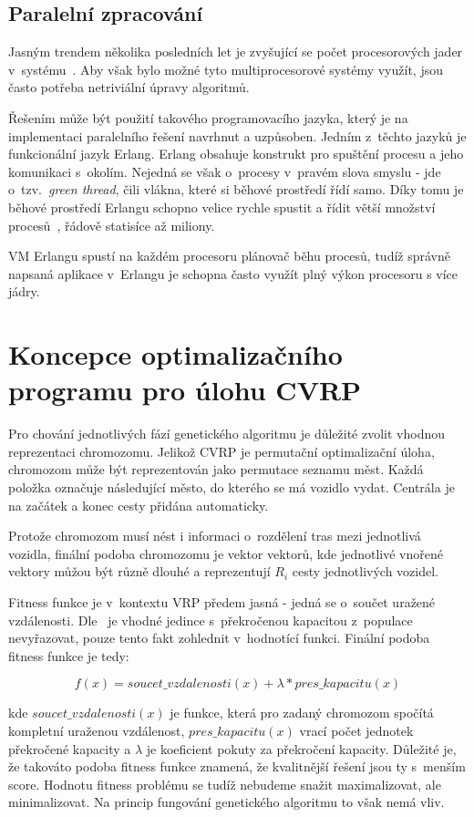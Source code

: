 \documentclass[a4paper]{article}
\begin{document}
\subsection{Paralelní zpracování}
Jasným trendem několika posledních let je zvyšující se počet procesorových jader v~systému~\cite{sekanina}. Aby však bylo možné tyto multiprocesorové systémy využít, jsou často potřeba netriviální úpravy algoritmů.

Řešením může být použití takového programovacího jazyka, který je na implementaci paralelního řešení navrhnut a uzpůsoben. Jedním z~těchto jazyků je funkcionální jazyk Erlang. Erlang obsahuje konstrukt pro spuštění procesu a jeho komunikaci s~okolím. Nejedná se však o~procesy v~pravém slova smyslu - jde o~tzv.\ \emph{green thread}, čili vlákna, které si běhové prostředí řídí samo. Díky tomu je běhové prostředí Erlangu schopno velice rychle spustit a řídit větší množství procesů~\cite{armstrong}, řádově statisíce až miliony.

VM Erlangu spustí na každém procesoru plánovač běhu procesů, tudíž správ\-ně napsaná aplikace v~Erlangu je schopna často využít plný výkon procesoru s více jádry.

\section{Koncepce optimalizačního programu pro ú\-lo\-hu CVRP}
Pro chování jednotlivých fází genetického algoritmu je důležité zvolit vhodnou reprezentaci chromozomu. Jelikož CVRP je permutační optimalizační úloha, chromozom může být reprezentován jako permutace seznamu měst. Každá po\-lož\-ka označuje ná\-sle\-du\-jící město, do kterého se má vozidlo vydat. Centrála je na začátek a konec cesty přidána automaticky.

Protože chromozom musí nést i informaci o~rozdělení tras mezi jednotlivá vozidla, finální podoba chromozomu je vektor vektorů, kde jednotlivé vnořené vektory můžou být různě dlouhé a reprezentují $R_i$ cesty jednotlivých vozidel.

Fitness funkce je v~kontextu VRP předem jasná - jedná se o~součet uražené vzdálenosti. Dle~\cite{cneo} je vhodné jedince s~překročenou kapacitou z~populace ne\-vy\-řa\-zo\-vat, pouze tento fakt zohlednit v~hodnotící funkci. Finální podoba fitness funkce je tedy:

\[f(x) = soucet\_vzdalenosti(x) + \lambda*pres\_kapacitu(x)\]

\noindent kde $soucet\_vzdalenosti(x)$ je funkce, která pro zadaný chromozom spočítá kompletní uraženou vzdálenost, $pres\_kapacitu(x)$ vrací počet jednotek překročené kapacity a $\lambda$ je koeficient pokuty za překročení kapacity. Důležité je, že takováto podoba fitness funkce znamená, že kvalitnější řešení jsou ty s~menším score. Hodnotu fitness problému se tudíž nebudeme snažit maximalizovat, ale minimalizovat. Na princip fungování genetického algoritmu to však nemá vliv.
\end{document}
